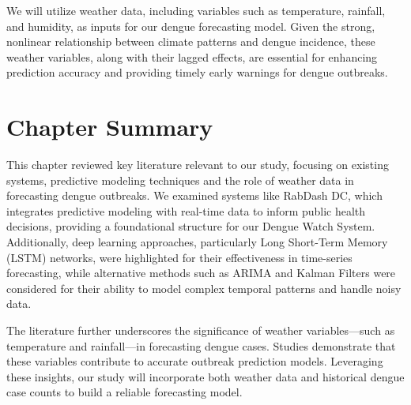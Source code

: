 We will utilize weather data, including variables such as temperature, rainfall, and humidity, as inputs for our dengue forecasting model. Given the strong, nonlinear relationship between climate patterns and dengue incidence, these weather variables, along with their lagged effects, are essential for enhancing prediction accuracy and providing timely early warnings for dengue outbreaks.


\section{Chapter Summary}
This chapter reviewed key literature relevant to our study, focusing on existing systems, predictive modeling techniques and the role of weather data in forecasting dengue outbreaks. We examined systems like RabDash DC, which integrates predictive modeling with real-time data to inform public health decisions, providing a foundational structure for our Dengue Watch System. Additionally, deep learning approaches, particularly Long Short-Term Memory (LSTM) networks, were highlighted for their effectiveness in time-series forecasting, while alternative methods such as ARIMA and Kalman Filters were considered for their ability to model complex temporal patterns and handle noisy data.

The literature further underscores the significance of weather variables—such as temperature and rainfall—in forecasting dengue cases. Studies demonstrate that these variables contribute to accurate outbreak prediction models. Leveraging these insights, our study will incorporate both weather data and historical dengue case counts to build a reliable forecasting model.







